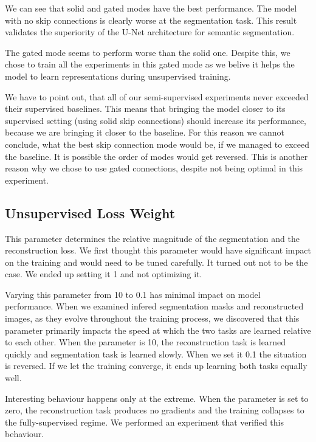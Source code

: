 We can see that solid and gated modes have the best performance. The model with no skip connections is clearly worse at the segmentation task. This result validates the superiority of the U-Net architecture for semantic segmentation.

The gated mode seems to perform worse than the solid one. Despite this, we chose to train all the experiments in this gated mode as we belive it helps the model to learn representations during unsupervised training.

We have to point out, that all of our semi-supervised experiments never exceeded their supervised baselines. This means that bringing the model closer to its supervised setting (using solid skip connections) should increase its performance, because we are bringing it closer to the baseline. For this reason we cannot conclude, what the best skip connection mode would be, if we managed to exceed the baseline. It is possible the order of modes would get reversed. This is another reason why we chose to use gated connections, despite not being optimal in this experiment.


\subsection{Unsupervised Loss Weight}
\label{sec:UnsupervisedLossWeight}

This parameter determines the relative magnitude of the segmentation and the reconstruction loss. We first thought this parameter would have significant impact on the training and would need to be tuned carefully. It turned out not to be the case. We ended up setting it 1 and not optimizing it.

Varying this parameter from 10 to 0.1 has minimal impact on model performance. When we examined infered segmentation masks and reconstructed images, as they evolve throughout the training process, we discovered that this parameter primarily impacts the speed at which the two tasks are learned relative to each other. When the parameter is 10, the reconstruction task is learned quickly and segmentation task is learned slowly. When we set it 0.1 the situation is reversed. If we let the training converge, it ends up learning both tasks equally well.

Interesting behaviour happens only at the extreme. When the parameter is set to zero, the reconstruction task produces no gradients and the training collapses to the fully-supervised regime. We performed an experiment that verified this behaviour.


